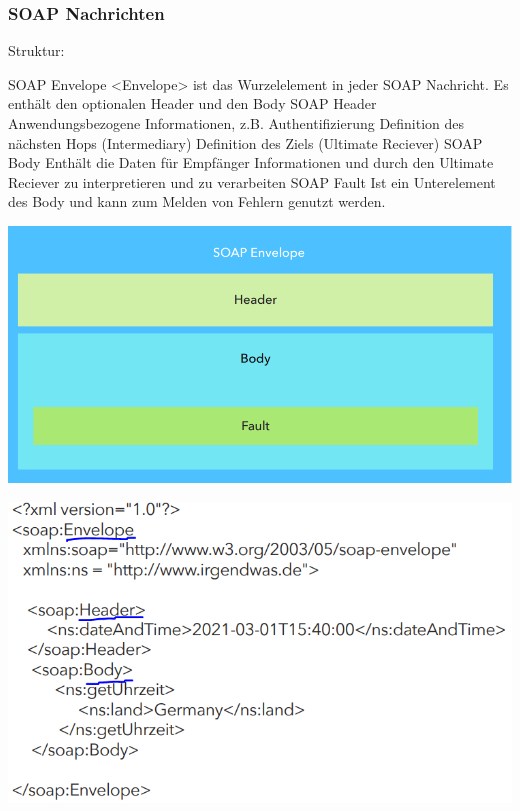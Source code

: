 \documentclass[12pt,a4paper]{article}
\begin{document}
\subsubsection{SOAP Nachrichten}
Struktur:\\
\begin{outline}
	\1 SOAP Envelope
		\2 <Envelope> ist das Wurzelelement in jeder SOAP Nachricht. Es enthält den optionalen Header und den Body
	\1 SOAP Header
		\2 Anwendungsbezogene Informationen, z.B. Authentifizierung
		\2 Definition des nächsten Hops (Intermediary)
		\2 Definition des Ziels (Ultimate Reciever)
	\1 SOAP Body
		\2 Enthält die Daten für Empfänger
		\2 Informationen und durch den Ultimate Reciever zu interpretieren und zu verarbeiten
	\1 SOAP Fault
		\2 Ist ein Unterelement des Body und kann zum Melden von Fehlern genutzt werden.
\end{outline}
\begin{minipage}{.49\textwidth}
	\includegraphics[width=\textwidth]{Bilder/soap_nachricht.PNG}
\end{minipage}
\hspace{.02\textwidth}
\begin{minipage}{.49\textwidth}
	\includegraphics[width=\textwidth]{Bilder/soap_nachricht2.PNG}
\end{minipage}\\
\end{document}
